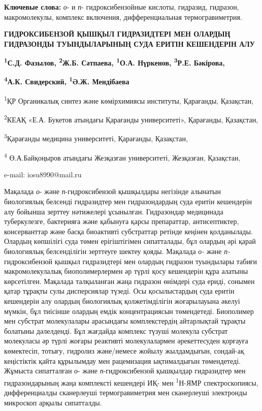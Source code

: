 {\bfseries Ключевые слова:} \emph{о}- и \emph{п}- гидроксибензойные
кислоты, гидразид, гидразон, макромолекулы, комплекс включения,
дифференциальная термогравиметрия.

{\bfseries ГИДРОКСИБЕНЗОЙ ҚЫШҚЫЛ ГИДРАЗИДТЕРІ МЕН ОЛАРДЫҢ ГИДРАЗОНДЫ
ТУЫНДЫЛАРЫНЫҢ СУДА ЕРИТІН КЕШЕНДЕРІН АЛУ}

{\bfseries \textsuperscript{1}С.Д. Фазылов, \textsuperscript{2}Ж.Б.
Сәтпаева, \textsuperscript{1}О.А. Нүркенов, \textsuperscript{3}Р.Е.
Бәкірова,}

{\bfseries \textsuperscript{4}А.К. Свидерский, \textsuperscript{1}Ә.Ж.
Мендібаева}

\textsuperscript{1}ҚР Органикалық синтез және көмірхимиясы институты,
Қарағанды, Қазақстан,

\textsuperscript{2}КЕАҚ «Е.А. Букетов атындағы Қарағанды университеті»,
Қарағанды, Қазақстан,

\textsuperscript{3}Қарағанды медицина университеті, Қарағанды,
Қазақстан,

\textsuperscript{4} Ө.А.Байқоңыров атындағы Жезқазған университеті,
Жезқазған, Қазақстан,

e-mail: iosu8990@mail.ru

Мақалада \emph{о}- және \emph{п}-гидроксибензой қышқылдары негізінде
алынатын биологиялық белсенді гидразидтер мен гидразондардың суда еритін
кешендерін алу бойынша зерттеу нәтижелері ұсынылған. Гидразондар
медицинада туберкулезге, бактерияға және қабынуға қарсы препараттар,
антисептиктер, консерванттар және басқа биоактивті субстраттар ретінде
кеңінен қолданылады. Олардың көпшілігі суда төмен ерігіштігімен
сипатталады, бұл олардың әрі қарай биологиялық белсенділігін зерттеуге
шектеу қояды. Мақалада \emph{о-} және \emph{п-}гидроксибензой қышқыл
гидразидтері мен олардың гидразон туындылары табиғи макромолекулалық
биополимерлермен әр түрлі қосу кешендерін құра алатыны көрсетілген.
Мақалада талқыланған жаңа гидразон өнімдері суда ериді, сонымен қатар
тұрақты сулы дисперсиялар түзеді. Осы қосылыстардың суда еритін
кешендерін алу олардың биологиялық қолжетімділігін жоғарылауына әкелуі
мүмкін, бұл тиісінше олардың емдік концентрациясын төмендетеді.
Биополимер мен субстрат молекулалары арасындағы комплекстердің
айтарлықтай тұрақты болатыны дәлелденді. Бұл жағдайда комплекс түзуші
молекула субстрат молекуласы әр түрлі жоғары реактивті молекулалармен
әрекеттесуден қорғауға көмектесіп, тотығу, гидролиз және/немесе жойылу
жылдамдығын, сондай-ақ кеңістіктік қайта құрылымдау мен рацемизация
ықтималдығын төмендетеді. Жұмыста сипатталған \emph{о}- және
\emph{п}-гидроксибензой қышқылдар гидразидтер мен гидразондарының жаңа
комплексті кешендері ИҚ- мен \textsuperscript{1}Н-ЯМР спектроскопиясы,
дифференциалды сканерлеуші термогравиметрия мен сканерлеуші электронды
микроскоп арқылы сипатталды.

